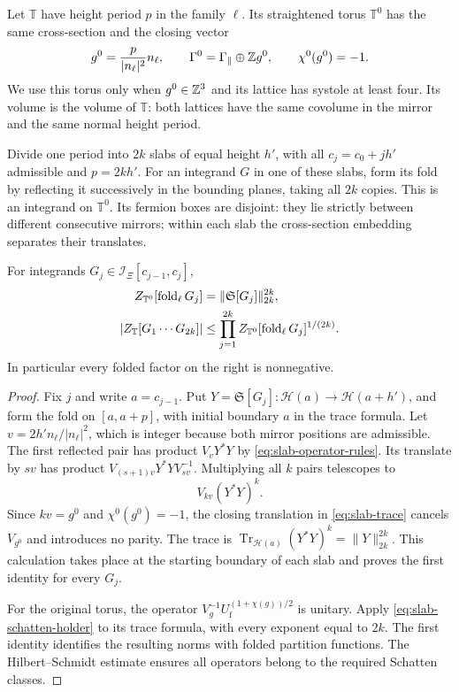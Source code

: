 Let $\mathbb T$ have height period $p$ in the family $\ell$. Its
straightened torus $\mathbb T^0$ has the same cross-section and the
closing vector
\begin{equation}\label{eq:slab-straight-vector}
 g^0=\frac p{|n_\ell|^2}n_\ell,
 \qquad \Gamma^0=\Gamma_\parallel\oplus\mathbb Z g^0,
 \qquad\chi^0(g^0)=-1.
\end{equation}
We use this torus only when $g^0\in\mathbb Z^3$ and its lattice has systole
at least four. Its volume is the volume of $\mathbb T$: both lattices
have the same covolume in the mirror and the same normal height period.

Divide one period into $2k$ slabs of equal height $h'$, with all
$c_j=c_0+jh'$ admissible and $p=2kh'$. For an integrand $G$ in one of
these slabs, form its fold by reflecting it successively in the
bounding planes, taking all $2k$ copies. This is an integrand on
$\mathbb T^0$. Its fermion boxes are disjoint: they lie strictly
between different consecutive mirrors; within each slab the
cross-section embedding separates their translates.

\begin{proposition}\label{prop:slab-fold-holder}
For integrands $G_j\in\mathcal I_\Xi[c_{j-1},c_j]$,
\begin{align}\label{eq:slab-fold-holder}
 Z_{\mathbb T^0}[\operatorname{fold}_\ell G_j]
              &=\|\mathfrak S[G_j]\|_{2k}^{2k},\notag\\
 |Z_{\mathbb T}[G_1\cdots G_{2k}]|
              &\le\prod_{j=1}^{2k}
               Z_{\mathbb T^0}[\operatorname{fold}_\ell G_j]^{1/(2k)}.
\end{align}
In particular every folded factor on the right is nonnegative.
\end{proposition}

\begin{proof}
Fix $j$ and write $a=c_{j-1}$. Put
$Y=\mathfrak S[G_j]:\mathcal H(a)\to\mathcal H(a+h')$, and form
the fold on $[a,a+p]$, with initial boundary $a$ in the trace formula.
Let
$v=2h'n_\ell/|n_\ell|^2$, which is integer because both mirror
positions are admissible. The first reflected pair has product
$V_vY^*Y$ by \eqref{eq:slab-operator-rules}. Its translate by $sv$
has product $V_{(s+1)v}Y^*YV_{sv}^{-1}$. Multiplying all $k$ pairs
telescopes to
\[
 V_{kv}(Y^*Y)^k.
\]
Since $kv=g^0$ and $\chi^0(g^0)=-1$, the closing translation in
\eqref{eq:slab-trace} cancels $V_{g^0}$ and introduces no parity.
The trace is
$\operatorname{Tr}_{\mathcal H(a)}(Y^*Y)^k=\|Y\|_{2k}^{2k}$.
This calculation takes place at the starting boundary of each slab
and proves the first identity for every $G_j$.

For the original torus, the operator
$V_g^{-1}U_{\mathrm f}^{(1+\chi(g))/2}$ is unitary. Apply
\eqref{eq:slab-schatten-holder} to its trace formula, with every
exponent equal to $2k$. The first identity identifies the resulting
norms with folded partition functions. The Hilbert--Schmidt estimate
ensures all operators belong to the required Schatten classes.
\end{proof}

